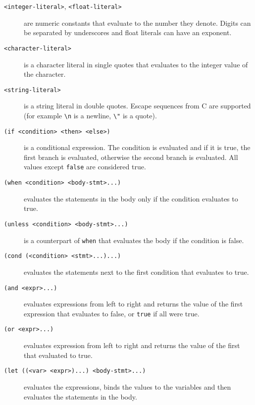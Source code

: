 \begin{description}
  \item[\texttt{<integer-literal>}, \texttt{<float-literal>}] are numeric
    constants that evaluate to the number they denote. Digits can be separated
    by underscores and float literals can have an exponent.

  \item[\texttt{<character-literal>}] is a character literal in single quotes
    that evaluates to the integer value of the character.

  \item[\texttt{<string-literal>}] is a string literal in double quotes. Escape
    sequences from C are supported (for example \texttt{\textbackslash{}n} is a
    newline, \texttt{\textbackslash{}"} is a quote).

  \item[\texttt{(if <condition> <then> <else>)}] is a conditional expression.
    The condition is evaluated and if it is true, the first branch is evaluated,
    otherwise the second branch is evaluated. All values except \texttt{false}
    are considered true.

  \item[\texttt{(when <condition> <body-stmt>...)}] evaluates the statements in
    the body only if the condition evaluates to true.

  \item[\texttt{(unless <condition> <body-stmt>...)}] is a counterpart of
    \texttt{when} that evaluates the body if the condition is false.
    
  \item[\texttt{(cond (<condition> <stmt>...)...)}] evaluates the statements
    next to the first condition that evaluates to true.

  \item[\texttt{(and <expr>...)}] evaluates expressions from left to right and
    returns the value of the first expression that evaluates to false, or
    \texttt{true} if all were true.

  \item[\texttt{(or <expr>...)}] evaluates expression from left to right and
    returns the value of the first that evaluated to true.

  \item[\texttt{(let ((<var> <expr>)...) <body-stmt>...)}] evaluates the
    expressions, binds the values to the variables and then evaluates the
    statements in the body.


\end{description}
